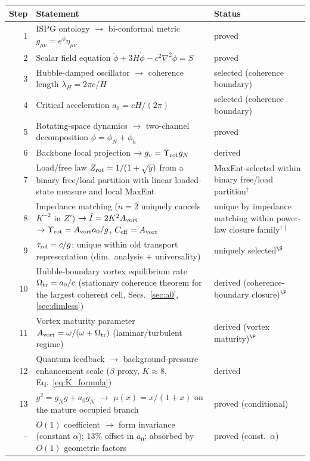 \documentclass[11pt]{article}
\begin{document}
\medskip
\begin{center}
\begin{tabular}{rp{7.5cm}l}
\toprule
\textbf{Step} & \textbf{Statement} & \textbf{Status} \\
\midrule
1 & ISPG ontology $\to$ bi-conformal metric
    $g_{\mu\nu}=e^\phi\eta_{\mu\nu}$
  & proved \\
2 & Scalar field equation
    $\ddot\phi+3H\dot\phi-c^2\nabla^2\phi=S$
  & proved \\
3 & Hubble-damped oscillator $\to$ coherence length
    $\lambda_H=2\pi c/H$
  & selected (coherence boundary) \\
4 & Critical acceleration $a_0=cH/(2\pi)$
  & selected (coherence boundary) \\
5 & Rotating-space dynamics $\to$ two-channel decomposition
    $\phi=\phi_N+\phi_h$
  & proved \\
6 & Backbone local projection $\to g_v=\Upsilon_{\rm rot}g_N$
  & derived \\
7 & Load/free law $Z_{\rm rot}=1/(1+\sqrt{y})$
    from a binary free/load partition with linear loaded-state measure
    and local MaxEnt
  & MaxEnt-selected within binary free/load partition${}^{\dagger}$ \\
8 & Impedance matching ($n=2$ uniquely cancels $K^{-2}$ in $Z'$)
    $\to \hat I=2K^2A_{\rm vort}$
    $\to \Upsilon_{\rm rot}=A_{\rm vort}a_0/g$,
    $C_{\rm eff}=A_{\rm vort}$
  & unique by impedance matching within power-law closure family${}^{\dagger\dagger}$ \\
9 & $\tau_{\rm rel}=c/g$: unique within old transport representation
    (dim.\ analysis $+$ universality)
  & uniquely selected${}^{\S}$ \\
10 & Hubble-boundary vortex equilibrium rate
    $\Omega_{\rm tr}=a_0/c$ (stationary coherence theorem
    for the largest coherent cell, Secs.~\ref{sec:a0}, \ref{sec:dimless})
  & derived (coherence-boundary closure)${}^{\P}$ \\
11 & Vortex maturity parameter
    $A_{\rm vort}=\omega/(\omega+\Omega_{\rm tr})$
    (laminar/turbulent regime)
  & derived (vortex maturity)${}^{\P}$ \\
12 & Quantum feedback $\to$ background-pressure enhancement scale
    ($\beta$ proxy, $K\approx 8$, Eq.~\eqref{eq:K_formula})
  & derived \\
13 & $g^2=g_N g+a_0 g_N$ $\to$ $\mu(x)=x/(1+x)$
    on the mature occupied branch
  & proved (conditional) \\
-- & $O(1)$ coefficient $\to$ form invariance (constant $\alpha$);
    13\% offset in $a_0$; absorbed by $O(1)$ geometric factors
  & proved (const.~$\alpha$) \\
\bottomrule
\end{tabular}
\end{center}
\end{document}
